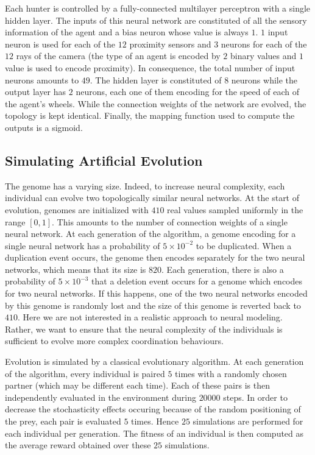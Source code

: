     Each hunter is controlled by a fully-connected multilayer perceptron with a single hidden layer. The inputs of this neural network are constituted of all the sensory information of the agent and a bias neuron whose value is always $1$. $1$ input neuron is used for each of the $12$ proximity sensors and $3$ neurons for each of the $12$ rays of the camera (the type of an agent is encoded by $2$ binary values and $1$ value is used to encode proximity). In consequence, the total number of input neurons amounts to $49$. The hidden layer is constituted of $8$ neurons while the output layer has $2$ neurons, each one of them encoding for the speed of each of the agent's wheels. While the connection weights of the network are evolved, the topology is kept identical. Finally, the mapping function used to compute the outputs is a sigmoid.


  \subsection{Simulating Artificial Evolution}
    The genome has a varying size. Indeed, to increase neural complexity, each individual can evolve two topologically similar neural networks. At the start of evolution, genomes are initialized with $410$ real values sampled uniformly in the range \([0,1]\). This amounts to the number of connection weights of a single neural network. At each generation of the algorithm, a genome encoding for a single neural network has a probability of \(5 \times 10^{-2}\) to be duplicated. When a duplication event occurs, the genome then encodes separately for the two neural networks, which means that its size is $820$. Each generation, there is also a probability of \(5 \times 10^{-3}\) that a deletion event occurs for a genome which encodes for two neural networks. If this happens, one of the two neural networks encoded by this genome is randomly lost and the size of this genome is reverted back to $410$. Here we are not interested in a realistic approach to neural modeling. Rather, we want to ensure that the neural complexity of the individuals is sufficient to evolve more complex coordination behaviours.

    Evolution is simulated by a classical evolutionary algorithm. At each generation of the algorithm, every individual is paired $5$ times with a randomly chosen partner (which may be different each time). Each of these pairs is then independently evaluated in the environment during $20000$ steps. In order to decrease the stochasticity effects occuring because of the random positioning of the prey, each pair is evaluated $5$ times. Hence $25$ simulations are performed for each individual per generation. The fitness of an individual is then computed as the average reward obtained over these $25$ simulations.

